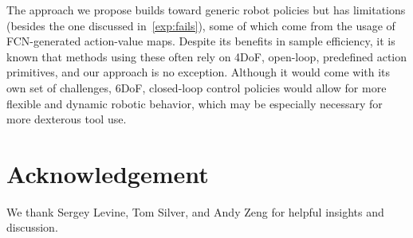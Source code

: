 \documentclass[10pt,twocolumn,letterpaper]{article}
\begin{document}
The approach we propose builds toward generic robot policies but has limitations (besides the one discussed in~\cref{exp:fails}), some of which come from the usage of FCN-generated action-value maps. Despite its benefits in sample efficiency, it is known that methods using these often rely on 4DoF, open-loop, predefined action primitives, and our approach is no exception. Although it would come with its own set of challenges, 6DoF, closed-loop control policies would allow for more flexible and dynamic robotic behavior, which may be especially necessary for more dexterous tool use.



\section*{Acknowledgement}
We thank Sergey Levine, Tom Silver, and Andy Zeng for helpful insights and discussion.

{\small


}
\end{document}
